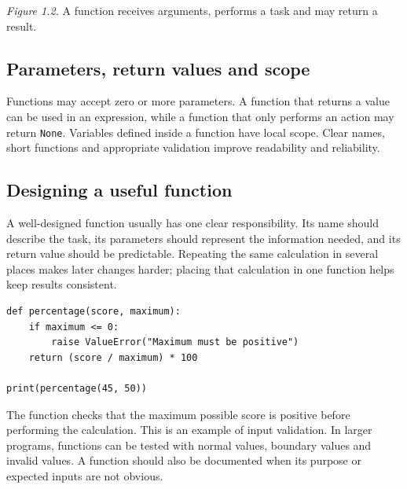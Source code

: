 \documentclass[11pt,openany,oneside]{book}
\begin{document}
\begin{center}
\end{center}
\textit{Figure 1.2.} A function receives arguments, performs a task and may return a result.

\subsection{Parameters, return values and scope}
Functions may accept zero or more parameters. A function that returns a value can be used in an expression, while a function that only performs an action may return \texttt{None}. Variables defined inside a function have local scope. Clear names, short functions and appropriate validation improve readability and reliability.

\subsection{Designing a useful function}
A well-designed function usually has one clear responsibility. Its name should describe the task, its parameters should represent the information needed, and its return value should be predictable. Repeating the same calculation in several places makes later changes harder; placing that calculation in one function helps keep results consistent.

\begin{lstlisting}[style=pythonstyle]
def percentage(score, maximum):
    if maximum <= 0:
        raise ValueError("Maximum must be positive")
    return (score / maximum) * 100

print(percentage(45, 50))
\end{lstlisting}
The function checks that the maximum possible score is positive before performing the calculation. This is an example of input validation. In larger programs, functions can be tested with normal values, boundary values and invalid values. A function should also be documented when its purpose or expected inputs are not obvious.
\end{document}
